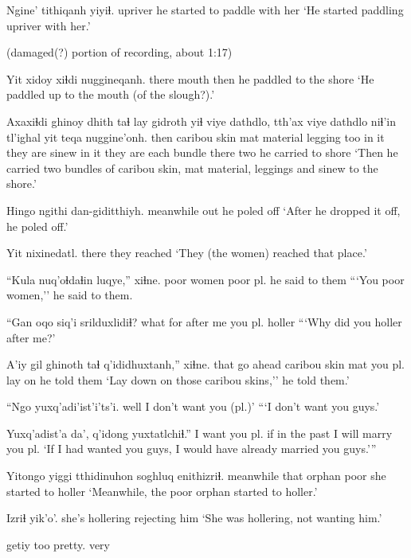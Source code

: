 \documentclass[12pt]{article}
\begin{document}
\gll Ngine' tithiqanh            yiyiɬ.
upriver  {he started to paddle}  {with her}
\glt `He started paddling upriver with her.'
\glend

(damaged(?) portion of recording, about 1:17)

\gll Yit   xidoy xiɬdi nuggineqanh.
there mouth then  {he paddled to the shore}
\glt `He paddled up to the mouth (of the slough?).'
\glend

\gll Axaxiɬdi ghinoy  dhith taɬ lay      gidroth yiɬ viye dathdlo, tth'ax viye  dathdlo    niɬ'in tl'ighal yit   teqa nuggine'onh.
then          caribou skin  mat material legging too {in it} {they are} sinew {in it} {they are}  each   bundle   there two  {he carried to shore}
\glt `Then he carried two bundles of caribou skin, mat material, leggings and sinew to the shore.'
\glend

\gll Hingo     ngithi dan-giditthiyh.
meanwhile out     {he poled off}
\glt `After he dropped it off, he poled off.'
\glend

\gll Yit   nixinedatl.
there {they reached}
\glt `They (the women) reached that place.'
\glend

\gll ``Kula nuq'oɬdaɬin luqye,''  xiɬne.
poor women       {poor pl.} {he said to them}
\glt ```You poor women,'' he said to them.
\glend

\gll ``Gan  oqo siq'i    srilduxlidiɬ?
what for {after me} {you pl. holler}
\glt ```Why did you holler after me?'
\glend

\gll A'iy gil      ghinoth      taɬ q'ididhuxtanh,'' xiɬne.
that {go ahead} {caribou skin} mat {you pl. lay on} {he told them}
\glt `Lay down on those caribou skins,'' he told them.'
\glend

\gll ``Ngo  {yuxq'adi'ist'i'ts'i}.
well {I don't want you (pl.)'}
\glt ```I don't want you guys.'
\glend

\gll Yuxq'adist'a da', q'idong yuxtatlchiɬ.''
{I want you pl.}  if  {in the past} {I will marry you pl.}
\glt `If I had wanted you guys, I would have already married you guys.'''
\glend

\gll Yitongo yiggi    tthidinuhon soghluq enithizriɬ.
meanwhile that orphan      poor    {she started to holler}
\glt `Meanwhile, the poor orphan started to holler.'
\glend

\gll Izriɬ            yik'o'.
{she's hollering}  {rejecting him}
\glt `She was hollering, not wanting him.'
\glend

 getiy too pretty.
{} very
\glt 
\glend
\end{document}

